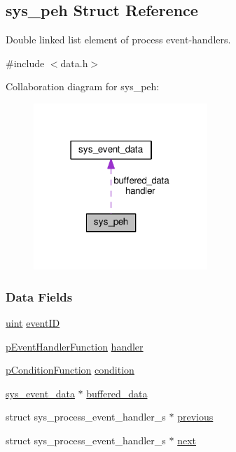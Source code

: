 \hypertarget{structsys__peh}{}\subsection{sys\+\_\+peh Struct Reference}
\label{structsys__peh}


Double linked list element of process event-\/handlers.  




{\ttfamily \#include $<$data.\+h$>$}



Collaboration diagram for sys\+\_\+peh\+:\nopagebreak
\begin{figure}[H]
\begin{center}
\leavevmode
\includegraphics[width=186pt]{d4/d1b/structsys__peh__coll__graph}
\end{center}
\end{figure}
\subsubsection*{Data Fields}
\begin{DoxyCompactItemize}
\item 
\hyperlink{definitions_8h_a1445ebbbf93d62972255ec5e89a5ab01}{uint} \hyperlink{structsys__peh_a7d9fce797a1666da32c8f76d8c748132}{event\+I\+D}
\item 
\hyperlink{events_8h_a3db5730a7fed6827a4c46ff3fae3e55b}{p\+Event\+Handler\+Function} \hyperlink{structsys__peh_a9603c4c65e4e4bf2912d9eb87da7bf51}{handler}
\item 
\hyperlink{events_8h_a653a4a4b7d9f5a65e1415365267a9d9e}{p\+Condition\+Function} \hyperlink{structsys__peh_ac6054670e82aec5a0bfef3b7e114c9e5}{condition}
\item 
\hyperlink{structsys__event__data}{sys\+\_\+event\+\_\+data} $\ast$ \hyperlink{structsys__peh_ab9909d1cf3fca775e314682ef25ae132}{buffered\+\_\+data}
\item 
struct sys\+\_\+process\+\_\+event\+\_\+handler\+\_\+s $\ast$ \hyperlink{structsys__peh_abff1942a90e410b023d50b4fd6b6e8ed}{previous}
\item 
struct sys\+\_\+process\+\_\+event\+\_\+handler\+\_\+s $\ast$ \hyperlink{structsys__peh_a899a879b50fc6baf6d8d2417eee0e8c5}{next}
\end{DoxyCompactItemize}


